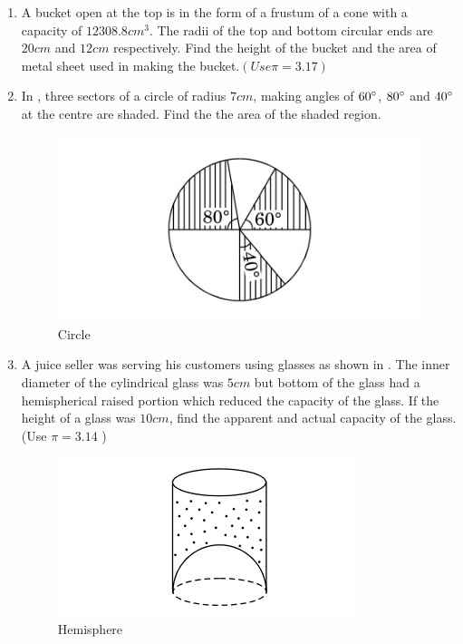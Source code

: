 \begin{enumerate}
\item A bucket open at the top is in the form of a frustum of a cone with a capacity of $12308.8 cm^3 $. The radii of the top and bottom circular ends are $20 cm $ and $12 cm $ respectively. Find the height of the bucket and the area of metal sheet used in making the bucket.$(Use \pi=3.17)$


\item In , three sectors of a circle of radius $7cm$, making angles of $60\degree$,
$80\degree$ and $40\degree$ at the centre are shaded. Find the the area of the shaded region.
\begin{figure}[H]
    \centering
    \includegraphics[width=\columnwidth]{figs/Figure_2.png}
    \caption{Circle}
    \label{fig:fig-2}
\end{figure}

\item A juice seller was serving his customers using glasses as shown in  . The inner diameter of the cylindrical glass was $5 cm$ but bottom of the glass had a hemispherical raised portion which reduced the capacity of the glass. If the height of a glass was $10 cm$, find the apparent and actual capacity of the glass. (Use $\pi = 3.14$ )
\begin{figure}[H]
    \centering
    \includegraphics[width=\columnwidth]{figs/Figure_3.png}
    \caption{Hemisphere}
    

\end{figure}
\end{enumerate}

